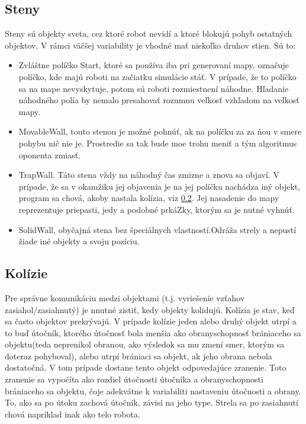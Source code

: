\subsection{Steny}\label{walls} %
Steny sú objekty sveta, cez ktoré robot nevidí a ktoré blokujú pohyb ostatných objektov. V rámci väčšej variability je vhodné mať niekoľko druhov stien. Sú to:\\
\begin{itemize}
\item Zvláštne políčko Start, ktoré sa používa iba pri generovaní mapy, označuje políčko, kde majú roboti na začiatku simulácie stáť. V prípade, že to políčko sa na mape nevyskytuje, potom sú roboti rozmiestnení náhodne. Hľadanie náhodného polía by nemalo presahovať rozumnu veľkosť vzhľadom na veľkosť mapy.
\item MovableWall, touto stenou je možné pohnúť, ak na políčku za za ňou v smere pohybu nič nie je. Prostredie sa tak bude moe trohu meniť a tým algoritmus oponenta zmiasť.
\item TrapWall. Táto stena vždy na náhodný čas zmizne a znova sa objaví. V prípade, že sa v okamžiku jej objavenia je na jej políčku nachádza iný objekt, program sa chová, akoby nastala kolízia, viz \ref{kolizie}. Jej nasadenie do mapy reprezentuje priepasti, jedy a podobné prkáZky, ktorým sa je nutné vyhnúť.
\item SolidWall, obyčajná stena bez špeciálnych vlastností.Odráža strely a nepustí žiade iné objekty a svoju pozíciu.
\end {itemize}

\subsection{Kolízie}\label{kolizie}
Pre správne komunikáciu medzi objektami (t.j. vyriešenie vzťahov zasiahol/zasiahnutý) je nnutné zistiť, kedy objekty kolidujú. Kolízia je stav, keď sa často objektov prekrývajú. V prípade kolízie jeden alebo druhý objekt utrpí a to buď útočník, ktorého útočnosť bola menšia ako obranyschopnosť brániaceho sa objektu(teda neprenikol obranou, ako výsledok sa mu zmení smer, ktorým sa doteraz pohyboval), alebo utrpí brániaci sa objekt, ak jeho obrana nebola dostatočná. V tom prípade dostane tento objekt odpovedajúce zranenie. Toto zranenie sa vypočíta ako rozdiel útočnosti útočníka a obranyschopnosti brániaceho sa objektu, čoje adekvátne k variabiliti nastaveniu útočnosti a obrany. To, ako sa po útoku zachová útočník, závisí na jeho type. Strela sa po zasiahnutí chová napríklad inak ako telo robota.
